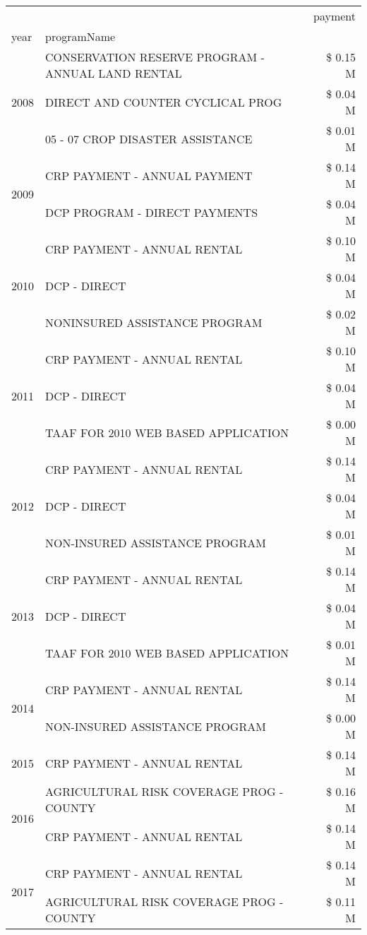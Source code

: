 \begin{tabular}{llr}
\toprule
 &  & payment \\
year & programName &  \\
\midrule
\multirow[t]{3}{*}{2008} & CONSERVATION RESERVE PROGRAM - ANNUAL LAND RENTAL & \$ 0.15 M \\
 & DIRECT AND COUNTER CYCLICAL PROG & \$ 0.04 M \\
 & 05 - 07 CROP DISASTER ASSISTANCE & \$ 0.01 M \\
\cline{1-3}
\multirow[t]{2}{*}{2009} & CRP PAYMENT - ANNUAL PAYMENT & \$ 0.14 M \\
 & DCP PROGRAM - DIRECT PAYMENTS & \$ 0.04 M \\
\cline{1-3}
\multirow[t]{3}{*}{2010} & CRP PAYMENT - ANNUAL RENTAL & \$ 0.10 M \\
 & DCP - DIRECT & \$ 0.04 M \\
 & NONINSURED ASSISTANCE PROGRAM & \$ 0.02 M \\
\cline{1-3}
\multirow[t]{3}{*}{2011} & CRP PAYMENT - ANNUAL RENTAL & \$ 0.10 M \\
 & DCP - DIRECT & \$ 0.04 M \\
 & TAAF FOR 2010 WEB BASED APPLICATION & \$ 0.00 M \\
\cline{1-3}
\multirow[t]{3}{*}{2012} & CRP PAYMENT - ANNUAL RENTAL & \$ 0.14 M \\
 & DCP - DIRECT & \$ 0.04 M \\
 & NON-INSURED ASSISTANCE PROGRAM & \$ 0.01 M \\
\cline{1-3}
\multirow[t]{3}{*}{2013} & CRP PAYMENT - ANNUAL RENTAL & \$ 0.14 M \\
 & DCP - DIRECT & \$ 0.04 M \\
 & TAAF FOR 2010 WEB BASED APPLICATION & \$ 0.01 M \\
\cline{1-3}
\multirow[t]{2}{*}{2014} & CRP PAYMENT - ANNUAL RENTAL & \$ 0.14 M \\
 & NON-INSURED ASSISTANCE PROGRAM & \$ 0.00 M \\
\cline{1-3}
2015 & CRP PAYMENT - ANNUAL RENTAL & \$ 0.14 M \\
\cline{1-3}
\multirow[t]{2}{*}{2016} & AGRICULTURAL RISK COVERAGE PROG - COUNTY & \$ 0.16 M \\
 & CRP PAYMENT - ANNUAL RENTAL & \$ 0.14 M \\
\cline{1-3}
\multirow[t]{3}{*}{2017} & CRP PAYMENT - ANNUAL RENTAL & \$ 0.14 M \\
 & AGRICULTURAL RISK COVERAGE PROG - COUNTY & \$ 0.11 M \\

\end{tabular}
